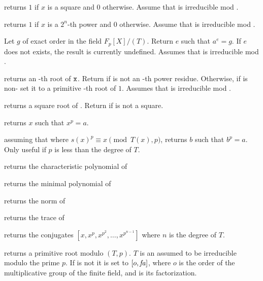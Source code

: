  returns $1$ if $x$ is a square
and $0$ otherwise. Assume that  is irreducible mod .

 returns $1$ if $x$ is
a $2^n$-th power and $0$ otherwise. Assume that  is irreducible mod
.

 Let $g$ of exact
order  in the field $F_p[X]/(T)$. Return $e$ such that $a^e=g$. If
$e$ does not exists, the result is currently undefined. Assumes that 
is irreducible mod .

 returns an
-th root of ${\tt x}$.  Return  if  is not an
-th power residue. Otherwise, if  is non- set it to
a primitive -th root of $1$. Assumes that  is irreducible mod
.

 returns a square root of .
Return  if  is not a square.

 returns $x$ such that $x^p = a$.

 assuming that
 where $s(x)^p \equiv x\pmod{T(x),p}$,
returns $b$ such that $b^p=a$. Only useful if $p$ is less than the degree of
$T$.

 returns the characteristic
polynomial of 

 returns the minimal polynomial
of 

 returns the norm of 

 returns the trace of 

 returns the conjugates
$[x,x^p,x^{p^2},\ldots,x^{p^{n-1}}]$ where $n$ is the degree of $T$.

 returns a primitive root modulo
$(T,p)$. $T$ is an  assumed to be irreducible modulo the prime
$p$. If  is not  it is set to $[o,\hbox{\it fa\/}]$, where $o$ is the
order of the multiplicative group of the finite field, and  is
its factorization.


